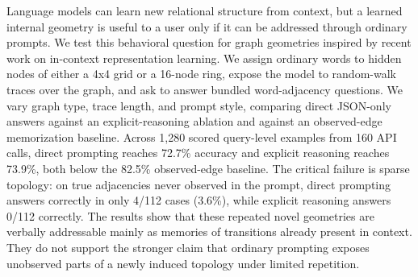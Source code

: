 Language models can learn new relational structure from context, but a learned internal geometry is useful to a user only if it can be addressed through ordinary prompts. We test this behavioral question for graph geometries inspired by recent work on in-context representation learning. We assign ordinary words to hidden nodes of either a 4x4 grid or a 16-node ring, expose the model to random-walk traces over the graph, and ask \gptfourone to answer bundled word-adjacency questions. We vary graph type, trace length, and prompt style, comparing direct JSON-only answers against an explicit-reasoning ablation and against an observed-edge memorization baseline. Across 1,280 scored query-level examples from 160 API calls, direct prompting reaches 72.7\% accuracy and explicit reasoning reaches 73.9\%, both below the 82.5\% observed-edge baseline. The critical failure is sparse topology: on true adjacencies never observed in the prompt, direct prompting answers correctly in only 4/112 cases (3.6\%), while explicit reasoning answers 0/112 correctly. The results show that these repeated novel geometries are verbally addressable mainly as memories of transitions already present in context. They do not support the stronger claim that ordinary prompting exposes unobserved parts of a newly induced topology under limited repetition.
